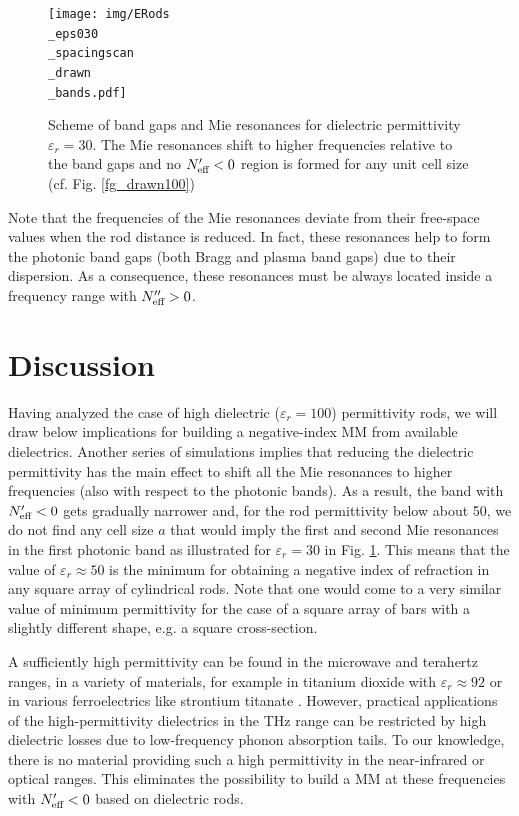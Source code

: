 {\begin{figure}
	\centering
    \texttt{[image: img/ERods\\\_eps030\\\_spacingscan\\\_drawn\\\_bands.pdf]}
    \caption{Scheme of band gaps and Mie resonances for dielectric permittivity $\varepsilon_r = 30$. The Mie resonances shift to higher frequencies relative to the band gaps and no $N_{\text{eff} }'<0$ region is formed for any unit cell size (cf. Fig. \ref{fg_drawn100})}
\label{fg_drawn030}
\end{figure}

Note that the frequencies of the Mie resonances deviate from their free-space 
values when the rod distance is reduced. In fact, these resonances help to form 
the photonic band gaps (both Bragg and plasma band gaps) due to their 
dispersion. As a consequence, these resonances must be always located inside a 
frequency range with $N_{\text{eff} }''>0$.

\section{Discussion}
Having analyzed the case of high dielectric ($\varepsilon_r=100$) permittivity rods, we
will draw below implications for building a negative-index MM from available dielectrics.
Another series of simulations implies that reducing the dielectric permittivity has the main effect
to shift all the Mie resonances to higher frequencies (also with respect to the photonic
bands). As a result, the band with $N_{\text{eff} }'<0$ gets gradually narrower and, for the rod
permittivity below about 50, we do not find any cell size $a$ that would imply the first
and second Mie resonances in the first photonic band as illustrated for $\varepsilon_r = 30$ in Fig. \ref{fg_drawn030}. This means that the value of
$\varepsilon_{r} \approx 50$ is the minimum for obtaining a negative index of refraction
in any square array of cylindrical rods. Note that one would come to a very similar value
of minimum permittivity for the case of a square array of bars with a slightly different
shape, e.g. a square cross-section. 

A sufficiently high permittivity can be found in the microwave and terahertz ranges, 
in a variety of materials, for example in titanium dioxide with $\varepsilon_r \approx 92$ \cite{nemec2009tunable} 
or in various ferroelectrics like strontium titanate \cite{skoromets2011tuning}. However, practical applications of
the high-permittivity dielectrics in the THz range can be restricted by high dielectric
losses due to low-frequency phonon absorption tails. To our knowledge, there is no
material providing such a high permittivity in the near-infrared or optical ranges. This
eliminates the possibility to build a MM at these frequencies with $N_{\text{eff} }'<0$ based on dielectric
rods.

}
